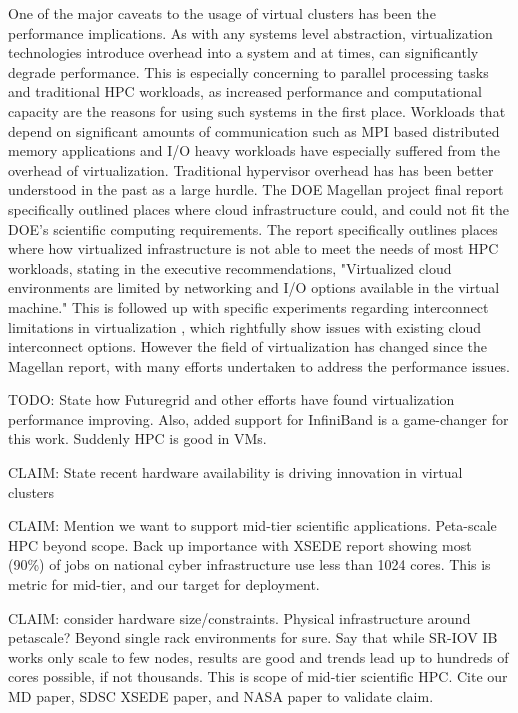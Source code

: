 
One of the major caveats to the usage of virtual clusters has been the performance implications. As with any systems level abstraction, virtualization technologies introduce overhead into a system and at times, can significantly degrade performance. This is especially concerning to parallel processing tasks and traditional HPC workloads, as increased performance and computational capacity are the reasons for using such systems in the first place. Workloads that depend on significant amounts of communication such as MPI based distributed memory applications and I/O heavy workloads have especially suffered from the overhead of virtualization. Traditional hypervisor overhead has has been better understood in the past as a large hurdle. The DOE Magellan project final report \cite{MagellanFinal} specifically outlined places where cloud infrastructure could, and could not fit the DOE's scientific computing requirements. The report specifically outlines places where how virtualized infrastructure is not able to meet the needs of most HPC workloads, stating in the executive recommendations, "Virtualized cloud environments are limited by networking and I/O options available in the virtual machine." This is followed up with specific experiments regarding interconnect limitations in virtualization \cite{Ramakrishnan2012}, which rightfully show issues with existing cloud interconnect options.  However the field of virtualization has changed since the Magellan report, with many efforts undertaken to address the performance issues. 

TODO: State how Futuregrid and other efforts have found virtualization performance improving. Also, added support for InfiniBand is a game-changer for this work. Suddenly HPC is good in VMs.

\cite{hazelhurst2008scientific}
\cite{Luszczek:2011:EHC}
\cite{fox2013futuregrid}
\cite{jose2013sr}
\cite{Musleh2014cloud}

CLAIM: State recent hardware availability is driving innovation in virtual clusters

CLAIM: Mention we want to support mid-tier scientific applications. Peta-scale HPC beyond scope. Back up importance with XSEDE report showing most (90\%) of jobs on national cyber infrastructure use less than 1024 cores. This is metric for mid-tier, and our target for deployment.  

CLAIM: consider hardware size/constraints. Physical infrastructure around petascale? Beyond single rack environments for sure. Say that while SR-IOV IB works only scale to few nodes, results are good and trends lead up to hundreds of cores possible, if not thousands. This is scope of mid-tier scientific HPC. Cite our MD paper, SDSC XSEDE paper, and NASA paper to validate claim.


